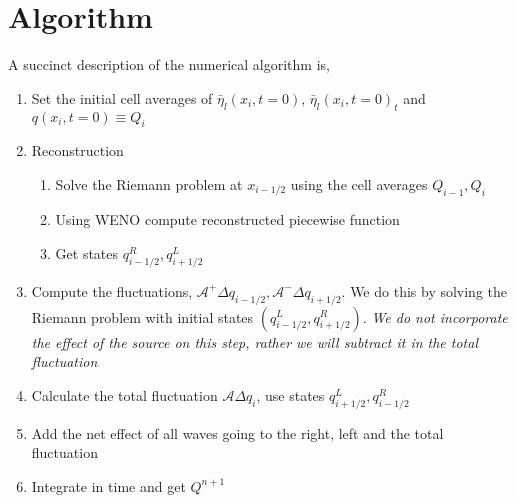 \documentclass[]{article}
\renewcommand{\vec}{}
\newcommand{\Q}{\vec{Q}}
\newcommand{\q}{\vec{q}}
\newcommand{\ximh}{x_{i-1/2}}
\newcommand{\qimh}{q_{i-1/2}}
\newcommand{\qiph}{q_{i+1/2}}
\newcommand{\bareta}{\bar{\eta}}
\newcommand{\A}{\mathcal{A}}
\begin{document}
\section{Algorithm}
A succinct description of the numerical algorithm is,
\begin{enumerate}
	\item Set the initial cell averages of $\bareta_l(x_i,t=0)$, $\bareta_l(x_i,t=0)_t$ and $\vec{q}(x_i,t=0)\equiv \vec{Q}_i$
	\item Reconstruction
	\begin{enumerate}
		\item Solve the Riemann problem at $\ximh$ using the cell averages $\Q_{i-1},\Q_i$
		\item Using WENO compute reconstructed piecewise function
		\item Get states $\qimh^R,\qiph^L$
	\end{enumerate}
	\item Compute the fluctuations, $\A^{+}\Delta\qimh,\A^{-}\Delta\qiph$. We do this by solving the Riemann problem with initial states $(\qimh^L,\qiph^R)$. \emph{We do not incorporate the effect of the source on this step, rather we will subtract it in the total fluctuation}
	\item Calculate the total fluctuation $\A\Delta\q_i$, use states $\qiph^L,\qimh^R$
	\item Add the net effect of all waves going to the right, left and the total fluctuation
	\item Integrate in time and get $\Q^{n+1}$
\end{enumerate}
\end{document}
